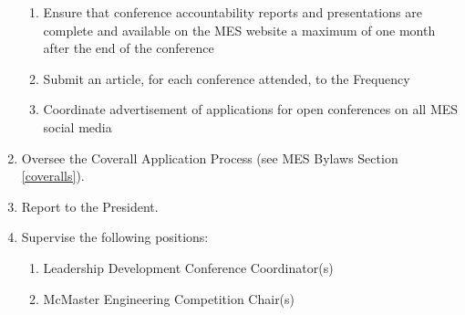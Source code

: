 \begin{enumerate}
  \begin{enumerate}
   \item
    Ensure that conference accountability reports and presentations are complete and available on the MES website a maximum of one month after the end of the conference
   \item
    Submit an article, for each conference attended, to the Frequency
   \item
    Coordinate advertisement of applications for open conferences on all MES social media
  \end{enumerate}
 \item
  Oversee the Coverall Application Process (see MES Bylaws Section \ref{coveralls}).
 \item
  Report to the President.
 \item
  Supervise the following positions:

  \begin{enumerate}
   \item
    Leadership Development Conference Coordinator(s)
   \item
    McMaster Engineering Competition Chair(s)

  \end{enumerate}
\end{enumerate}
